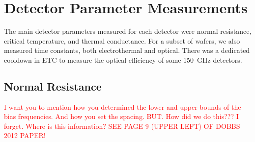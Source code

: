 \section{Detector Parameter Measurements}
\label{sec:parameter_measurements}

The main detector parameters measured for each detector were normal resistance, critical temperature, and thermal conductance. 
For a subset of wafers, we also measured time constants, both electrothermal and optical. 
There was a dedicated cooldown in \ac{ETC} to measure the optical efficiency of some 150~GHz detectors. 

\subsection{Normal Resistance}
\label{sec:normal_resistance}





\textcolor{red}{I want you to mention how you determined the lower and upper bounds of the bias frequencies. And how you set the spacing. BUT. How did we do this??? I forget. Where is this information? SEE PAGE 9 (UPPER LEFT) OF DOBBS 2012 PAPER!}

